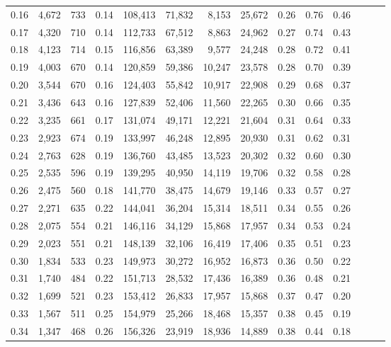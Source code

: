 \begin{tabular}{rrrrrrrrrrrrrr}
0.16 &  4,672 &  733 &  0.14 &  108,413 &   71,832 &   8,153 &  25,672 &  0.26 &  0.76 &      0.46 \\
0.17 &  4,320 &  710 &  0.14 &  112,733 &   67,512 &   8,863 &  24,962 &  0.27 &  0.74 &      0.43 \\
0.18 &  4,123 &  714 &  0.15 &  116,856 &   63,389 &   9,577 &  24,248 &  0.28 &  0.72 &      0.41 \\
0.19 &  4,003 &  670 &  0.14 &  120,859 &   59,386 &  10,247 &  23,578 &  0.28 &  0.70 &      0.39 \\
0.20 &  3,544 &  670 &  0.16 &  124,403 &   55,842 &  10,917 &  22,908 &  0.29 &  0.68 &      0.37 \\
0.21 &  3,436 &  643 &  0.16 &  127,839 &   52,406 &  11,560 &  22,265 &  0.30 &  0.66 &      0.35 \\
0.22 &  3,235 &  661 &  0.17 &  131,074 &   49,171 &  12,221 &  21,604 &  0.31 &  0.64 &      0.33 \\
0.23 &  2,923 &  674 &  0.19 &  133,997 &   46,248 &  12,895 &  20,930 &  0.31 &  0.62 &      0.31 \\
0.24 &  2,763 &  628 &  0.19 &  136,760 &   43,485 &  13,523 &  20,302 &  0.32 &  0.60 &      0.30 \\
0.25 &  2,535 &  596 &  0.19 &  139,295 &   40,950 &  14,119 &  19,706 &  0.32 &  0.58 &      0.28 \\
0.26 &  2,475 &  560 &  0.18 &  141,770 &   38,475 &  14,679 &  19,146 &  0.33 &  0.57 &      0.27 \\
0.27 &  2,271 &  635 &  0.22 &  144,041 &   36,204 &  15,314 &  18,511 &  0.34 &  0.55 &      0.26 \\
0.28 &  2,075 &  554 &  0.21 &  146,116 &   34,129 &  15,868 &  17,957 &  0.34 &  0.53 &      0.24 \\
0.29 &  2,023 &  551 &  0.21 &  148,139 &   32,106 &  16,419 &  17,406 &  0.35 &  0.51 &      0.23 \\
0.30 &  1,834 &  533 &  0.23 &  149,973 &   30,272 &  16,952 &  16,873 &  0.36 &  0.50 &      0.22 \\
0.31 &  1,740 &  484 &  0.22 &  151,713 &   28,532 &  17,436 &  16,389 &  0.36 &  0.48 &      0.21 \\
0.32 &  1,699 &  521 &  0.23 &  153,412 &   26,833 &  17,957 &  15,868 &  0.37 &  0.47 &      0.20 \\
0.33 &  1,567 &  511 &  0.25 &  154,979 &   25,266 &  18,468 &  15,357 &  0.38 &  0.45 &      0.19 \\
0.34 &  1,347 &  468 &  0.26 &  156,326 &   23,919 &  18,936 &  14,889 &  0.38 &  0.44 &      0.18 \\

\end{tabular}

